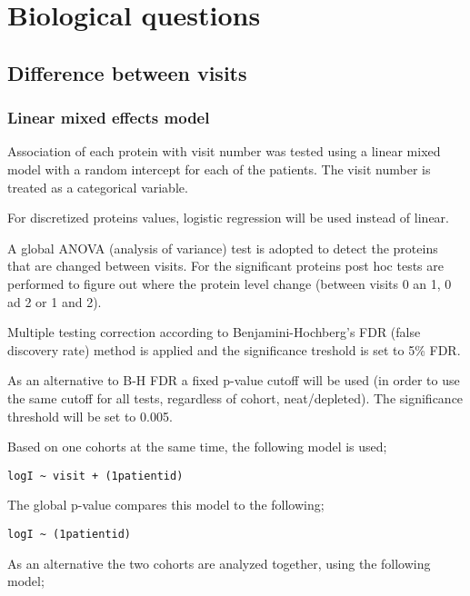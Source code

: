 \documentclass[
]{article}
\begin{document}
\FloatBarrier

\hypertarget{biological-questions}{%
\section{Biological questions}\label{biological-questions}}

\hypertarget{difference-between-visits}{%
\subsection{Difference between visits}\label{difference-between-visits}}

\hypertarget{linear-mixed-effects-model}{%
\subsubsection{Linear mixed effects model}\label{linear-mixed-effects-model}}

Association of each protein with visit number was tested using a linear mixed model with a random intercept for each of the patients. The visit number is treated as a categorical variable.

For discretized proteins values, logistic regression will be used instead of linear.

A global ANOVA (analysis of variance) test is adopted to detect the proteins that are changed between visits. For the significant proteins post hoc tests are performed to figure out where the protein level change (between visits 0 an 1, 0 ad 2 or 1 and 2).

Multiple testing correction according to Benjamini-Hochberg's FDR (false discovery rate) method is applied and the significance treshold is set to 5\% FDR.

As an alternative to B-H FDR a fixed p-value cutoff will be used (in order to use the same cutoff for all tests, regardless of cohort, neat/depleted). The significance threshold will be set to 0.005.

Based on one cohorts at the same time, the following model is used;

\texttt{logI\ \textasciitilde{}\ visit\ +\ (1\textbar{}patientid)}

The global p-value compares this model to the following;

\texttt{logI\ \textasciitilde{}\ (1\textbar{}patientid)}

As an alternative the two cohorts are analyzed together, using the following model;
\end{document}
